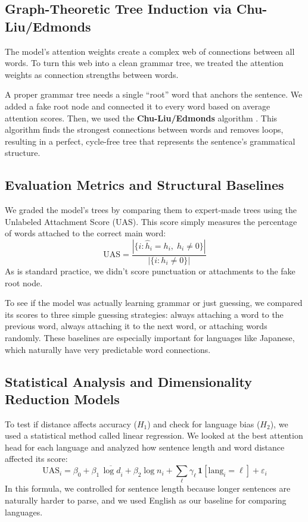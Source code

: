 \documentclass[11pt, a4paper]{article}
\begin{document}
\subsection{Graph-Theoretic Tree Induction via Chu-Liu/Edmonds}
The model's attention weights create a complex web of connections between all words. To turn this web into a clean grammar tree, we treated the attention weights as connection strengths between words. 

A proper grammar tree needs a single ``root'' word that anchors the sentence. We added a fake root node and connected it to every word based on average attention scores. Then, we used the \textbf{Chu-Liu/Edmonds} algorithm \citep{chu1965shortest}. This algorithm finds the strongest connections between words and removes loops, resulting in a perfect, cycle-free tree that represents the sentence's grammatical structure. 

\subsection{Evaluation Metrics and Structural Baselines}
We graded the model's trees by comparing them to expert-made trees using the Unlabeled Attachment Score (UAS). This score simply measures the percentage of words attached to the correct main word:
\begin{equation}
\text{UAS} = \frac{|\{i : \hat{h}_i = h_i,\; h_i \neq 0\}|}{|\{i : h_i \neq 0\}|}
\end{equation}
As is standard practice, we didn't score punctuation or attachments to the fake root node. 

To see if the model was actually learning grammar or just guessing, we compared its scores to three simple guessing strategies: always attaching a word to the previous word, always attaching it to the next word, or attaching words randomly. These baselines are especially important for languages like Japanese, which naturally have very predictable word connections.

\subsection{Statistical Analysis and Dimensionality Reduction Models}
To test if distance affects accuracy ($H_1$) and check for language bias ($H_2$), we used a statistical method called linear regression. We looked at the best attention head for each language and analyzed how sentence length and word distance affected its score:
\begin{equation}
\text{UAS}_i = \beta_0 + \beta_1\,\overline{\log d}_i + \beta_2\log n_i + \textstyle\sum_\ell \gamma_\ell\,\mathbf{1}[\text{lang}_i{=}\ell] + \varepsilon_i
\end{equation}
In this formula, we controlled for sentence length because longer sentences are naturally harder to parse, and we used English as our baseline for comparing languages.
\end{document}
